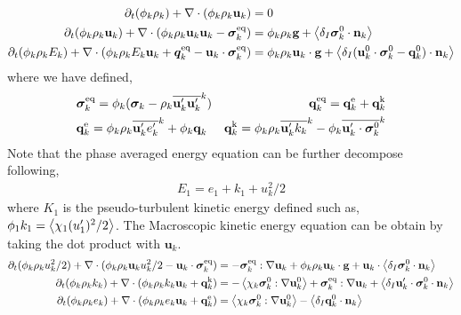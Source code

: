 \begin{align}
    \label{eq:dt_&vg_rho}
    \partial_t (\phi_k \rho_k)  
    + \mathbf{\nabla}\cdot (
        \phi_k \rho_k\textbf{u}_k
    )
    &= 
    0\\
    \label{eq:dt_&vg_rhou_k}
    \partial_t (\phi_k \rho_k\textbf{u}_k)  
    + \mathbf{\nabla}\cdot (
        \phi_k \rho_k\textbf{u}_k\textbf{u}_k
        - \bm{\sigma}_k^\text{eq}
    )
    &= 
    \phi_k \rho_k \textbf{g} 
    +  \left<\delta_I \bm{\sigma}_k^0 \cdot \textbf{n}_k\right>\\
    \label{eq:dt_&vg_rhoE_k}
    \partial_t (\phi_k\rho_kE_k)  
    + \mathbf{\nabla}\cdot (
        \phi_k\rho_kE_k\textbf{u}_k
        + \bm{q}_k^\text{eq}
        - \textbf{u}_k \cdot \bm{\sigma}_k^\text{eq}
        )
    &= 
    \phi_k \rho_k\textbf{u}_k \cdot \textbf{g} 
    + \left<\delta_I (\textbf{u}_k^0 \cdot \bm{\sigma}_k^0 - \textbf{q}_k^0)\cdot \textbf{n}_k\right>
\end{align} 
where we have defined, 
\begin{align*}
    &\bm{\sigma}_k^\text{eq}
    = \phi_k (
        \bm{\sigma}_k%
        - \rho_k\kavg{\textbf{u}_k'\textbf{u}_k'})  
    &\textbf{q}_k^\text{eq}
    =\textbf{q}_k^\text{e} +\textbf{q}_k^\text{k}  \\
    &\textbf{q}_k^\text{e}
    = \phi_k\rho_k \kavg{\textbf{u}_k' e_k'} 
    + \phi_k\textbf{q}_k 
    &\textbf{q}_k^\text{k}
    = \phi_k\rho_k \kavg{\textbf{u}_k' k_k} 
    - \phi_k\kavg{\textbf{u}_k' \cdot \bm{\sigma}_k^0}
\end{align*}
Note that the phase averaged energy equation can be further decompose following, 
\begin{align*}
    E_1 = e_1 + k_1 + u_k^2/2
\end{align*}
where $K_1$ is the pseudo-turbulent kinetic energy defined such as, $\phi_1 k_1 = \left<\chi_1 (u_1')^2/2\right>$. 
The Macroscopic kinetic energy equation can be obtain by taking the dot product with $\textbf{u}_k$. 
\begin{align}
    \partial_t (\phi_k \rho_ku_k^2/2)  
    + \mathbf{\nabla}\cdot (
        \phi_k \rho_k\textbf{u}_ku_k^2/2
        - \textbf{u}_k \cdot \bm{\sigma}_k^\text{eq}
    )
    &= 
    - \bm{\sigma}_k^\text{eq} : \mathbf{\nabla} \textbf{u}_k
    + \phi_k \rho_k \textbf{u}_k\cdot \textbf{g} 
    +  \textbf{u}_k\cdot \left<\delta_I \bm{\sigma}_k^0 \cdot \textbf{n}_k\right>\\
    \partial_t (\phi_k\rho_kk_k)  
    + \mathbf{\nabla}\cdot (
        \phi_k\rho_kk_k\textbf{u}_k
        + \textbf{q}_k^\text{k} 
        )
    &= 
    - \left<\chi_k\bm{\sigma}_k^0 : \mathbf{\nabla} \textbf{u}_k^0\right>
    + \bm{\sigma}_k^\text{eq} : \mathbf{\nabla} \textbf{u}_k
    + \left<\delta_I \textbf{u}_k' \cdot \bm{\sigma}_k^0 \cdot \textbf{n}_k\right>\\
    \partial_t (\phi_k\rho_ke_k)  
    + \mathbf{\nabla}\cdot (
        \phi_k \rho_ke_k\textbf{u}_k
        +
        \textbf{q}_k^\text{e} 
        )
    &= 
    \left<\chi_k\bm{\sigma}_k^0 : \mathbf{\nabla} \textbf{u}_k^0\right>
    - \left<\delta_I \textbf{q}_k^0 \cdot \textbf{n}_k\right> 
\end{align}


